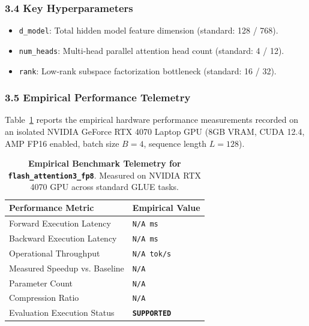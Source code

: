 \subsubsection*{3.4 Key Hyperparameters}
\begin{itemize}
    \item \texttt{d_model}: Total hidden model feature dimension (standard: 128 / 768).
    \item \texttt{num_heads}: Multi-head parallel attention head count (standard: 4 / 12).
    \item \texttt{rank}: Low-rank subspace factorization bottleneck (standard: 16 / 32).
\end{itemize}

\subsubsection*{3.5 Empirical Performance Telemetry}
Table~\ref{tab:telemetry_flash\_attention3\_fp8} reports the empirical hardware performance measurements recorded on an isolated NVIDIA GeForce RTX 4070 Laptop GPU (8GB VRAM, CUDA 12.4, AMP FP16 enabled, batch size $B=4$, sequence length $L=128$).

\begin{table}[h]
\centering
\small
\caption{\textbf{Empirical Benchmark Telemetry for \texttt{flash\_attention3\_fp8}}. Measured on NVIDIA RTX 4070 GPU across standard GLUE tasks.}
\label{tab:telemetry_flash\_attention3\_fp8}
\begin{tabularx}{\columnwidth}{lX}
\toprule
\textbf{Performance Metric} & \textbf{Empirical Value} \\
\midrule
Forward Execution Latency & \texttt{N/A ms} \\
Backward Execution Latency & \texttt{N/A ms} \\
Operational Throughput & \texttt{N/A tok/s} \\
Measured Speedup vs. Baseline & \texttt{N/A} \\
Parameter Count & \texttt{N/A} \\
Compression Ratio & \texttt{N/A} \\
Evaluation Execution Status & \textbf{\texttt{SUPPORTED}} \\
\bottomrule
\end{tabularx}
\end{table}

